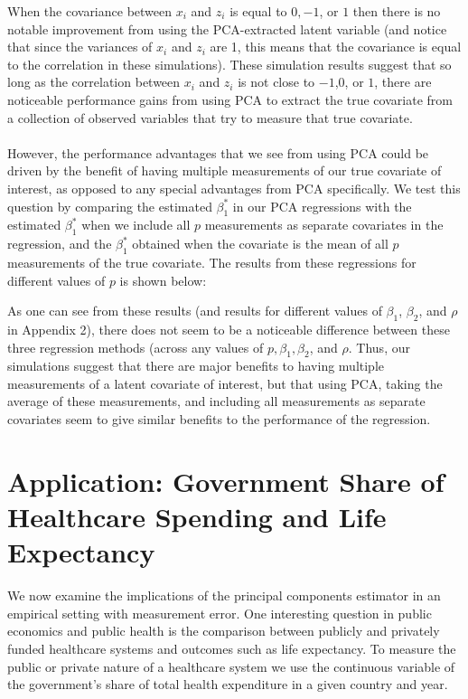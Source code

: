 \documentclass[12pt]{article}
\begin{document}
        

        When the covariance between $x_i$ and $z_i$ is equal to $0, -1$, or $1$ then there is no notable improvement from using the PCA-extracted latent variable (and notice that since the variances of $x_i$ and $z_i$ are 1, this means that the covariance is equal to the correlation in these simulations). These simulation results suggest that so long as the correlation between $x_i$ and $z_i$ is not close to $-1$,$0$, or $1$, there are noticeable performance gains from using PCA to extract the true covariate from a collection of observed variables that try to measure that true covariate.\\
        \\
        However, the performance advantages that we see from using PCA could be driven by the benefit of having multiple measurements of our true covariate of interest, as opposed to any special advantages from PCA specifically. We test this question by comparing the estimated $\beta_1^*$ in our PCA regressions with the estimated $\beta_1^*$ when we include all $p$ measurements as separate covariates in the regression, and the $\beta_1^*$ obtained when the covariate is the mean of all $p$ measurements of the true covariate. The results from these regressions for different values of $p$ is shown below:

        

        As one can see from these results (and results for different values of $\beta_1$, $\beta_2$, and $\rho$ in Appendix 2), there does not seem to be a noticeable difference between these three regression methods (across any values of $p, \beta_1,\beta_2$, and $\rho$. Thus, our simulations suggest that there are major benefits to having multiple measurements of a latent covariate of interest, but that using PCA, taking the average of these measurements, and including all measurements as separate covariates seem to give similar benefits to the performance of the regression.


    \section*{Application: Government Share of Healthcare Spending and Life Expectancy}

        We now examine the implications of the principal components estimator in an empirical setting with measurement error. One interesting question in public economics and public health is the comparison between publicly and privately funded healthcare systems and outcomes such as life expectancy. To measure the public or private nature of a healthcare system we use the continuous variable of the government's share of total health expenditure in a given country and year.
\end{document}
